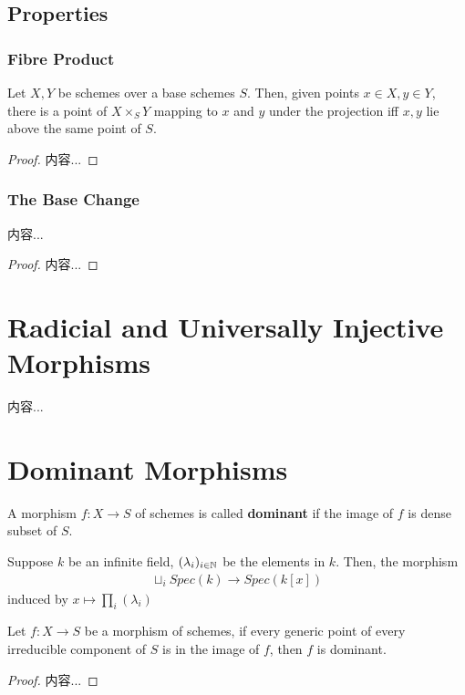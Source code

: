 \documentclass[Total.tex]{subfiles}
\begin{document}
		\subsection{Properties}
		\subsubsection{Fibre Product}
		\begin{lemma}
			Let $X,Y$ be schemes over a base schemes $S$. Then, given points $x\in X,y\in Y$, there is a point of $X\times_S Y$ mapping to $x$ and $y$ under the projection iff $x,y$ lie above the same point of $S$.
		\end{lemma}
		\begin{proof}
			内容...
		\end{proof}
		\subsubsection{The Base Change}
		\begin{lemma}
			内容...
		\end{lemma}
		\begin{proof}
			内容...
		\end{proof}
		\section{Radicial and Universally Injective Morphisms}
			\begin{Def}
				内容...
			\end{Def}
		
		\section{Dominant Morphisms}
			\begin{Def}
				A morphism $f:X\rightarrow S$ of schemes is called \textbf{dominant} if the image of $f$ is dense subset of $S$.
			\end{Def}
			\begin{example}
				Suppose $k$ be an infinite field, $(\lambda_i)_{i\in \mathbb{N}}$ be the elements in $k$. Then, the morphism
				\begin{gather*}
					\sqcup_i Spec(k)\rightarrow Spec(k[x])
				\end{gather*}
				induced by $x\mapsto \prod_{i} (\lambda_i)$
			\end{example}
			\begin{lemma}
				Let $f:X\rightarrow S$ be a morphism of schemes, if every generic point of every irreducible component of $S$ is in the image of $f$, then $f$ is dominant.
			\end{lemma}
			\begin{proof}
				内容...
			\end{proof}
			
\end{document}
